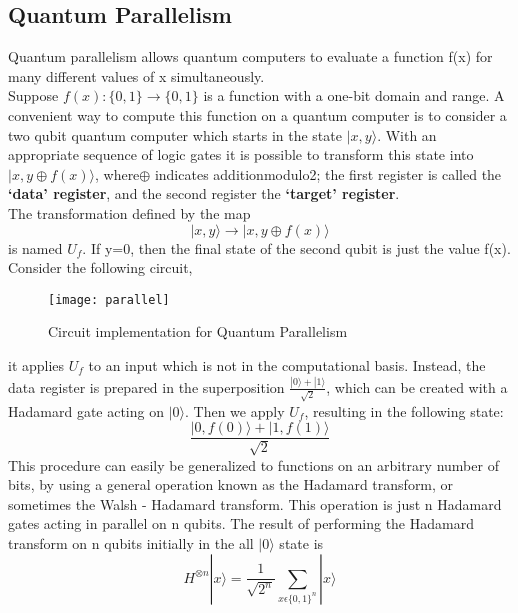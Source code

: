 \documentclass[12pt]{report}
\begin{document}
\subsection{Quantum Parallelism}
Quantum parallelism allows quantum computers to evaluate a function f(x) for many different values of x simultaneously.\\
Suppose $f(x):\{0,1\}\to\{ 0,1\}$ is a function with a one-bit domain and range. A convenient way to compute this function on a quantum computer is to consider a two qubit quantum computer which starts in the state $|x,y\rangle$. With an appropriate sequence of logic gates it is possible to transform this state into $|x,y\oplus f(x)\rangle$, where$\oplus$ indicates additionmodulo2; the first register is called the \textbf{‘data’ register}, and the second register the \textbf{‘target’ register}. \\
The transformation defined by the map 
\begin{equation}
|x,y\rangle \to |x,y\oplus f(x)\rangle
\end{equation} 
is named $U_f$. If y=0, then the final state of the second qubit is just the value f(x). Consider the following circuit,
\begin{figure}[h]
\centering
\texttt{[image: parallel]}
\caption{Circuit implementation for Quantum Parallelism}
\label{fig:parallel}
\end{figure}
it applies $U_f$ to an input which is not in the computational basis. Instead, the data register is prepared in the superposition $\frac{|0\rangle + |1\rangle}{\sqrt{2}}$, which can be created with a Hadamard gate acting on $|0\rangle$. Then we apply $U_f$, resulting in the following state: 
\begin{equation}
\frac{|0,f(0)\rangle + |1,f(1)\rangle}{\sqrt{2}}
\end{equation}
This procedure can easily be generalized to functions on an arbitrary number of bits, by using a general operation known as the Hadamard transform, or sometimes the Walsh - Hadamard transform. This operation is just n Hadamard gates acting in parallel on n qubits. The result of performing the Hadamard transform on n qubits initially in the all $|0\rangle$ state is 
\begin{equation}
H^{\otimes n}|x\rangle = \frac{1}{\sqrt{2^n}} \sum_{x\epsilon\{0,1\}^n} |x\rangle  
\end{equation} 
\end{document}
